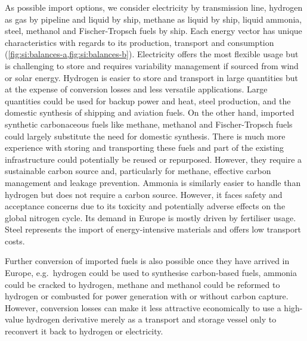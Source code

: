 \documentclass[5p,10pt]{elsarticle}
\begin{document}
As possible import options, we consider electricity by transmission line,
hydrogen as gas by pipeline and liquid by ship, methane as liquid by ship,
liquid ammonia, steel, methanol and Fischer-Tropsch fuels by ship. Each energy
vector has unique characteristics with regards to its production, transport and
consumption (\cref{fig:si:balances-a,fig:si:balances-b}). Electricity offers
the most flexible usage but is challenging to store and requires variability
management if sourced from wind or solar energy. Hydrogen is easier to store and
transport in large quantities but at the expense of conversion losses and less
versatile applications. Large quantities could be used for backup power and
heat, steel production, and the domestic synthesis of shipping and aviation
fuels. On the other hand, imported synthetic carbonaceous fuels like methane,
methanol and Fischer-Tropsch fuels could largely substitute the need for
domestic synthesis. There is much more experience with storing and transporting
these fuels and part of the existing infrastructure could potentially be reused
or repurposed. However, they require a sustainable carbon source and,
particularly for methane, effective carbon management and leakage
prevention.\cite{shirizadehImpactMethaneLeakage2023} Ammonia is similarly easier
to handle than hydrogen but does not require a carbon source. However, it faces
safety and acceptance concerns due to its toxicity and potentially adverse
effects on the global nitrogen
cycle.\cite{bertagniMinimizingImpactsAmmonia2023,wolframUsingAmmoniaShipping2022}
Its demand in Europe is mostly driven by fertiliser usage. Steel represents the
import of energy-intensive materials and offers low transport costs.

Further conversion of imported fuels is also possible once they have arrived in
Europe, e.g.~hydrogen could be used to synthesise carbon-based fuels, ammonia
could be cracked to hydrogen, methane and methanol could be reformed to hydrogen
or combusted for power generation with or without carbon capture. However,
conversion losses can make it less attractive economically to use a high-value
hydrogen derivative merely as a transport and storage vessel only to reconvert
it back to hydrogen or electricity.

\end{document}
